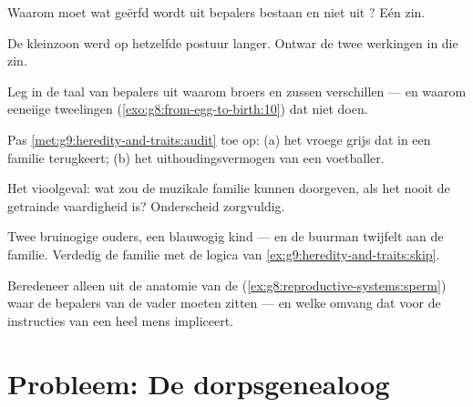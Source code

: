 \begin{exercise}[$\star$]\label{exo:g9:heredity-and-traits:6}
Waarom moet wat geërfd wordt uit bepalers bestaan en niet uit
? Eén zin.
\end{exercise}

\begin{exercise}[$\star\star$]\label{exo:g9:heredity-and-traits:7}
De kleinzoon werd op hetzelfde postuur langer. Ontwar de twee
werkingen in die zin.
\end{exercise}

\begin{exercise}[$\star\star$]\label{exo:g9:heredity-and-traits:8}
Leg in de taal van bepalers uit waarom broers en zussen
verschillen --- en waarom eeneiige tweelingen
(\cref{exo:g8:from-egg-to-birth:10}) dat niet doen.
\end{exercise}

\begin{exercise}[$\star\star$]\label{exo:g9:heredity-and-traits:9}
Pas \cref{met:g9:heredity-and-traits:audit} toe op: (a) het
vroege grijs dat in een familie terugkeert; (b) het
uithoudingsvermogen van een voetballer.
\end{exercise}

\begin{exercise}[$\star\star$]\label{exo:g9:heredity-and-traits:10}
Het vioolgeval: wat zou de muzikale familie kunnen doorgeven,
als het nooit de getrainde vaardigheid is? Onderscheid
zorgvuldig.
\end{exercise}

\begin{exercise}[$\star\star$]\label{exo:g9:heredity-and-traits:11}
Twee bruinogige ouders, een blauwogig kind --- en de buurman
twijfelt aan de familie. Verdedig de familie met de logica
van \cref{ex:g9:heredity-and-traits:skip}.
\end{exercise}

\begin{exercise}[$\star\star\star$]\label{exo:g9:heredity-and-traits:12}
Beredeneer alleen uit de anatomie van de 
(\cref{ex:g8:reproductive-systems:sperm}) waar de bepalers van
de vader moeten zitten --- en welke omvang dat voor de
instructies van een heel mens impliceert.
\end{exercise}

\section{Probleem: De dorpsgenealoog}

